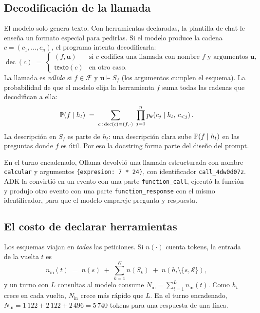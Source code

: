 \documentclass[11pt,letterpaper,oneside]{report}
\begin{document}
\subsection{Decodificación de la llamada}

El modelo solo genera texto. Con herramientas declaradas, la plantilla de chat le enseña un formato especial para pedirlas. Si el modelo produce la cadena $c=(c_1,\dots,c_n)$, el programa intenta decodificarla:
\begin{equation}
\operatorname{dec}(c) \;=\;
\begin{cases}
(f, \mathbf{u}) & \text{si } c \text{ codifica una llamada con nombre } f \text{ y argumentos } \mathbf{u},\\
\textsf{texto}(c) & \text{en otro caso.}
\end{cases}
\label{eq:dec}
\end{equation}
La llamada es \emph{válida} si $f\in\mathcal{F}$ y $\mathbf{u}\models S_f$ (los argumentos cumplen el esquema). La probabilidad de que el modelo elija la herramienta $f$ suma todas las cadenas que decodifican a ella:
\begin{equation}
\mathbb{P}(f \mid h_t) \;=\; \sum_{c\,:\,\operatorname{dec}(c)=(f,\cdot)} \;\prod_{j=1}^{n} p_\theta\!\left(c_j \mid h_t,\, c_{<j}\right).
\label{eq:pfun}
\end{equation}
La descripción en $S_f$ es parte de $h_t$: una descripción clara sube $\mathbb{P}(f\mid h_t)$ en las preguntas donde $f$ es útil. Por eso la docstring forma parte del diseño del prompt.

\begin{ejemplo}
En el turno encadenado, Ollama devolvió una llamada estructurada con nombre \texttt{calcular} y argumentos \texttt{\{\textquotedbl{}expresion\textquotedbl{}: \textquotedbl{}7 * 24\textquotedbl{}\}}, con identificador \texttt{call\_4dw0d07z}. ADK la convirtió en un evento con una parte \texttt{function\_call}, ejecutó la función y produjo otro evento con una parte \texttt{function\_response} con el mismo identificador, para que el modelo empareje pregunta y respuesta.
\end{ejemplo}

\subsection{El costo de declarar herramientas}

Los esquemas viajan en \emph{todas} las peticiones. Si $n(\cdot)$ cuenta tokens, la entrada de la vuelta $t$ es
\begin{equation}
n_{\text{in}}(t) \;=\; n(s) \;+\; \sum_{k=1}^{K} n(S_k) \;+\; n(h_t \setminus \{s,\mathcal{S}\}),
\label{eq:tokens}
\end{equation}
y un turno con $L$ consultas al modelo consume $N_{\text{in}}=\sum_{t=1}^{L} n_{\text{in}}(t)$. Como $h_t$ crece en cada vuelta, $N_{\text{in}}$ crece más rápido que $L$. En el turno encadenado, $N_{\text{in}} = 1\,122 + 2\,122 + 2\,496 = 5\,740$ tokens para una respuesta de una línea.
\end{document}
